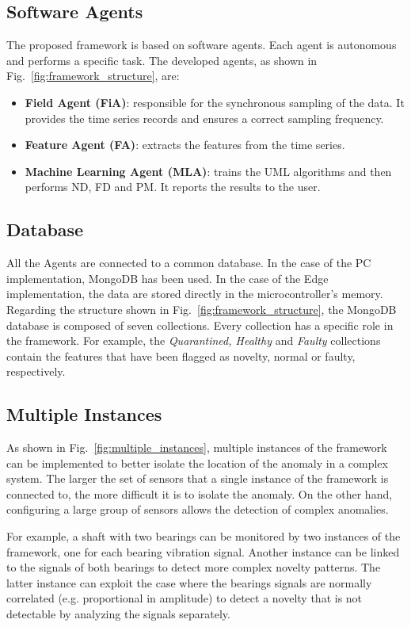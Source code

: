 \subsection{Software Agents}
The proposed framework is based on software agents. Each agent is autonomous and performs a specific task. The developed agents, as shown in Fig.~\ref{fig:framework_structure}, are:
\begin{itemize}
    \item \textbf{Field Agent (FiA)}: responsible for the synchronous sampling of the data. It provides the time series records and ensures a correct sampling frequency.
    \item \textbf{Feature Agent (FA)}: extracts the features from the time series.
    \item \textbf{Machine Learning Agent (MLA)}: trains the UML algorithms and then performs ND, FD and PM. It reports the results to the user.
\end{itemize}

\subsection{Database}
All the Agents are connected to a common database. In the case of the PC implementation, MongoDB has been used. In the case of the Edge implementation, the data are stored directly in the microcontroller's memory.
Regarding the structure shown in Fig.~\ref{fig:framework_structure}, the MongoDB database is composed of seven collections. Every collection has a specific role in the framework. For example, the \emph{Quarantined, Healthy} and \emph{Faulty} collections contain the features that have been flagged as novelty, normal or faulty, respectively.

\subsection{Multiple Instances}
As shown in Fig.~\ref{fig:multiple_instances}, multiple instances of the framework can be implemented to better isolate the location of the anomaly in a complex system. The larger the set of sensors that a single instance of the framework is connected to, the more difficult it is to isolate the anomaly. On the other hand, configuring a large group of sensors allows the detection of complex anomalies. 

For example, a shaft with two bearings can be monitored by two instances of the framework, one for each bearing vibration signal. Another instance can be linked to the signals of both bearings to detect more complex novelty patterns. The latter instance can exploit the case where the bearings signals are normally correlated (e.g. proportional in amplitude) to detect a novelty that is not detectable by analyzing the signals separately.   

